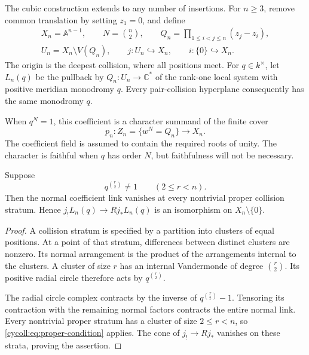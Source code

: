 The cubic construction extends to any number of insertions.
For $n\geq3$, remove common translation by setting $z_1=0$,
and define
\begin{equation}\label{cycoll:eq:vandermonde}
 \begin{gathered}
 X_n=\mathbb A^{n-1},\qquad N=\binom n2,\qquad
 Q_n=\prod_{1\leq i<j\leq n}(z_j-z_i),\\
 U_n=X_n\setminus V(Q_n),\qquad
 j:U_n\hookrightarrow X_n,\qquad i:\{0\}\hookrightarrow X_n.
 \end{gathered}
\end{equation}
The origin is the deepest collision, where all positions meet.
For $q\in k^\times$, let $L_n(q)$ be the pullback by
$Q_n:U_n\to\mathbb C^*$ of the rank-one local system with
positive meridian monodromy $q$. Every pair-collision
hyperplane consequently has the same monodromy $q$.

When $q^N=1$, this coefficient is a character summand of
the finite cover
\begin{equation}\label{cycoll:eq:cover}
 p_n:Z_n=\{w^N=Q_n\}\longrightarrow X_n.
\end{equation}
The coefficient field is assumed to contain the required
roots of unity. The character is faithful when $q$ has
order $N$, but faithfulness will not be necessary.

\begin{lemma}\label{cycoll:lem:proper-collisions}
Suppose
\begin{equation}\label{cycoll:eq:proper-condition}
 q^{\binom r2}\ne1\qquad(2\leq r<n).
\end{equation}
Then the normal coefficient link vanishes at every
nontrivial proper collision stratum. Hence
$j_!L_n(q)\to Rj_*L_n(q)$ is an isomorphism on
$X_n\setminus\{0\}$.
\end{lemma}
\begin{proof}
A collision stratum is specified by a partition into clusters
of equal positions. At a point of that stratum, differences
between distinct clusters are nonzero. Its normal arrangement
is the product of the arrangements internal to the clusters.
A cluster of size $r$ has an internal Vandermonde of degree
$\binom r2$. Its positive radial circle therefore acts by
$q^{\binom r2}$.

The radial circle complex contracts by the inverse of
$q^{\binom r2}-1$. Tensoring its contraction with the
remaining normal factors contracts the entire normal link.
Every nontrivial proper stratum has a cluster of size
$2\leq r<n$, so \eqref{cycoll:eq:proper-condition} applies.
The cone of $j_!\to Rj_*$ vanishes on these strata, proving
the assertion.
\end{proof}

